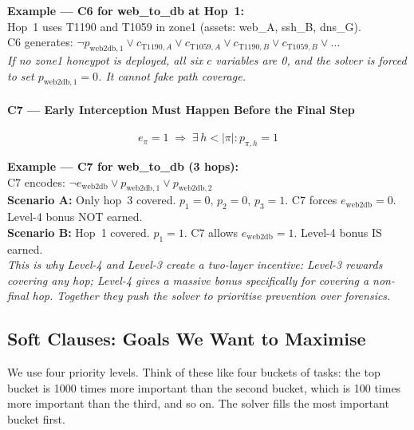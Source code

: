 \documentclass[journal]{IEEEtran}
\begin{document}
\begin{examplebox}
\textbf{Example --- C6 for web\_to\_db at Hop~1:}\\[3pt]
Hop~1 uses T1190 and T1059 in zone1 (assets: web\_A,
ssh\_B, dns\_G).\\
C6 generates:
$\neg p_{\text{web2db},1} \vee c_{\text{T1190},A}
\vee c_{\text{T1059},A} \vee c_{\text{T1190},B}
\vee c_{\text{T1059},B} \vee \ldots$\\[3pt]
\textit{If no zone1 honeypot is deployed, all six $c$
variables are 0, and the solver is forced to set
$p_{\text{web2db},1}=0$.
It cannot fake path coverage.}
\end{examplebox}

\paragraph{C7 --- Early Interception Must Happen Before the
Final Step}
\begin{equation}
  e_\pi = 1 \;\Longrightarrow\;
  \exists\, h < |\pi| : p_{\pi,h} = 1
\end{equation}

\begin{examplebox}
\textbf{Example --- C7 for web\_to\_db (3 hops):}\\[3pt]
C7 encodes:
$\neg e_{\text{web2db}} \vee p_{\text{web2db},1}
\vee p_{\text{web2db},2}$\\[3pt]
\textbf{Scenario A:} Only hop~3 covered.
$p_1=0,\,p_2=0,\,p_3=1$.
C7 forces $e_{\text{web2db}}=0$.
Level-4 bonus NOT earned.\\
\textbf{Scenario B:} Hop~1 covered.
$p_1=1$.
C7 allows $e_{\text{web2db}}=1$.
Level-4 bonus IS earned.\\[3pt]
\textit{This is why Level-4 and Level-3 create a two-layer
incentive: Level-3 rewards covering any hop; Level-4 gives
a massive bonus specifically for covering a non-final hop.
Together they push the solver to prioritise prevention over
forensics.}
\end{examplebox}

\subsection{Soft Clauses: Goals We Want to Maximise}

We use four priority levels.
Think of these like four buckets of tasks:
the top bucket is 1000 times more important than the second
bucket, which is 100 times more important than the third,
and so on.
The solver fills the most important bucket first.
\end{document}
